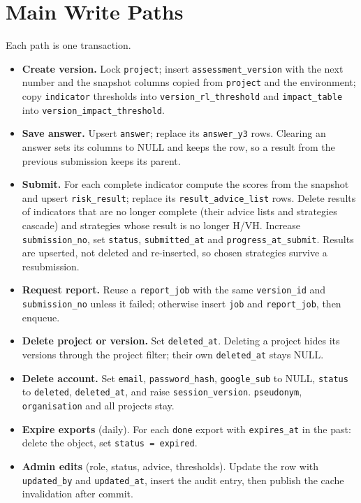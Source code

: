\documentclass[11pt,a4paper]{article}
\newcommand{\tb}[1]{\texttt{#1}}
\begin{document}
\needspace{0.5\textheight}\section{Main Write Paths}\label{sec:paths}
Each path is one transaction.
\begin{itemize}
\item \textbf{Create version.} Lock \tb{project}; insert \tb{assessment\_version} with the next number and the snapshot columns copied from \tb{project} and the environment; copy \tb{indicator} thresholds into \tb{version\_rl\_threshold} and \tb{impact\_table} into \tb{version\_impact\_threshold}.
\item \textbf{Save answer.} Upsert \tb{answer}; replace its \tb{answer\_y3} rows. Clearing an answer sets its columns to NULL and keeps the row, so a result from the previous submission keeps its parent.
\item \textbf{Submit.} For each complete indicator compute the scores from the snapshot and upsert \tb{risk\_result}; replace its \tb{result\_advice\_list} rows. Delete results of indicators that are no longer complete (their advice lists and strategies cascade) and strategies whose result is no longer H/VH. Increase \tb{submission\_no}, set \tb{status}, \tb{submitted\_at} and \tb{progress\_at\_submit}. Results are upserted, not deleted and re-inserted, so chosen strategies survive a resubmission.
\item \textbf{Request report.} Reuse a \tb{report\_job} with the same \tb{version\_id} and \tb{submission\_no} unless it failed; otherwise insert \tb{job} and \tb{report\_job}, then enqueue.
\item \textbf{Delete project or version.} Set \tb{deleted\_at}. Deleting a project hides its versions through the project filter; their own \tb{deleted\_at} stays NULL.
\item \textbf{Delete account.} Set \tb{email}, \tb{password\_hash}, \tb{google\_sub} to NULL, \tb{status} to \tb{deleted}, \tb{deleted\_at}, and raise \tb{session\_version}. \tb{pseudonym}, \tb{organisation} and all projects stay.
\item \textbf{Expire exports} (daily). For each \tb{done} export with \tb{expires\_at} in the past: delete the object, set \tb{status = expired}.
\item \textbf{Admin edits} (role, status, advice, thresholds). Update the row with \tb{updated\_by} and \tb{updated\_at}, insert the audit entry, then publish the cache invalidation after commit.
\end{itemize}
\end{document}
